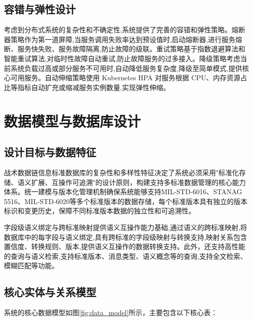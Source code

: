\subsection{容错与弹性设计}

考虑到分布式系统的复杂性和不确定性,系统提供了完善的容错和弹性策略。熔断器策略作为第一道屏障,当服务调用失败率达到预设值时,启动熔断器,进行服务熔断、服务快失败、服务故障隔离,防止故障的级联。重试策略基于指数退避算法和智能重试算法,对临时性故障自动重试,防止故障服务的过多接入。降级策略考虑当前系统负载过高或部分服务不可用时,自动降低服务复杂度,降级至简单模式,提供核心可用服务。自动伸缩策略使用 Kubernetes HPA 对服务根据 CPU、内存资源占比等指标自动扩充或缩减服务实例数量,实现弹性伸缩。

\section{数据模型与数据库设计}

\subsection{设计目标与数据特征}

战术数据链信息标准数据库的复杂性和多样性特征决定了系统必须采用"标准化存储、语义扩展、互操作可追溯"的设计原则，构建支持多标准数据管理的核心能力体系。统一建模与版本化管理机制确保系统能够支持MIL-STD-6016、STANAG 5516、MIL-STD-6020等多个标准版本的数据存储，每个标准版本具有独立的版本标识和变更历史，保障不同标准版本数据的独立性和可追溯性。

字段级语义绑定与跨标准映射提供语义互操作能力基础,通过语义的跨标准映射,将数据库中的每字段与语义绑定,具有跨标准的字段级映射与转换支持,映射关系包含置信度、转换规则、版本,提供语义互操作的数据转换支持。此外，还支持高性能的查询与语义检索,支持标准版本、消息类型、语义概念等的查询,支持全文检索、模糊匹配等功能。
\subsection{核心实体与关系模型}

系统的核心数据模型如图\ref{fig:data_model}所示，主要包含以下核心表：

